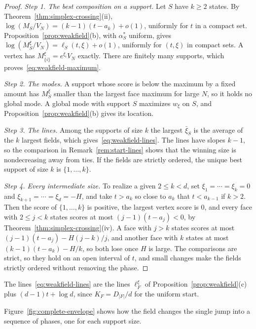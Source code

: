 \begin{proof}
\emph{Step 1. The best composition on a support.} Let $S$ have $k\ge2$ states. By
Theorem~\ref{thm:simplex-crossing}(ii), $\log(M_S/V_N)=(k-1)(t-a_k)+o(1)$, uniformly for $t$ in
a compact set. Proposition~\ref{prop:weakfield}(b), with $\alpha^*_S$ uniform, gives
$\log(M^\xi_S/V_N)=\ell_S(t,\xi)+o(1)$, uniformly for $(t,\xi)$ in compact sets. A vertex has
$M^\xi_{\{i\}}=e^{\xi_i}V_N$ exactly. There are finitely many supports, which
proves~\eqref{eq:weakfield-maximum}.

\emph{Step 2. The modes.} A support whose score is below the maximum by a fixed amount has
$M^\xi_S$ smaller than the largest face maximum for large $N$, so it holds no global mode. A
global mode with support $S$ maximizes $w_\xi$ on $S$, and Proposition~\ref{prop:weakfield}(b)
gives its location.

\emph{Step 3. The lines.} Among the supports of size $k$ the largest $\bar\xi_S$ is
the average of the $k$ largest fields, which gives~\eqref{eq:weakfield-lines}. The lines have
slopes $k-1$, so the comparison in Remark~\ref{rem:start-lines} shows that the winning size
is nondecreasing away from ties. If the fields
are strictly ordered, the unique best support of size $k$ is $\{1,\dots,k\}$.

\emph{Step 4. Every intermediate size.} To realize a given $2\le k<d$, set
$\xi_1=\cdots=\xi_k=0$ and $\xi_{k+1}=\cdots=\xi_d=-H$, and take $t>a_k$ so close to
$a_k$ that $t<a_{k-1}$ if $k>2$. Then the score of $\{1,\dots,k\}$ is positive, the
largest vertex score is $0$, and every face with $2\le j<k$ states scores at
most $(j-1)(t-a_j)<0$, by Theorem~\ref{thm:simplex-crossing}(iv). A face with $j>k$ states
scores at most $(j-1)(t-a_j)-H(j-k)/j$, and another face with $k$ states at most
$(k-1)(t-a_k)-H/k$, so both lose once $H$ is large. The comparisons are strict,
so they hold on an open interval of $t$, and small changes make the fields
strictly ordered without removing the phase.
\end{proof}

The lines~\eqref{eq:weakfield-lines} are the lines $\ell^\xi_F$ of
Proposition~\ref{prop:weakfield}(c) plus $(d-1)t+\log d$, since $K_F=D_{|F|}/d$ for the uniform start.

Figure~\ref{fig:complete-envelope} shows how the field changes the single jump into a
sequence of phases, one for each support size.

